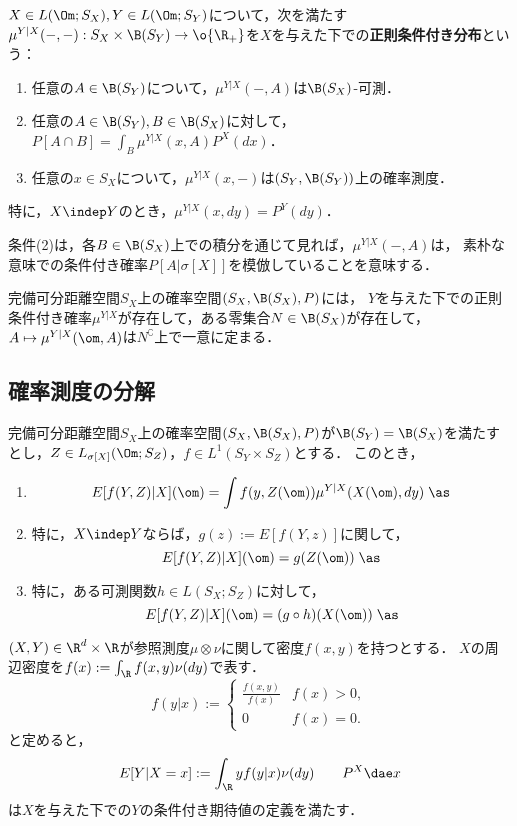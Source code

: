 \documentclass[uplatex,dvipdfmx]{jsreport}
\begin{document}
\begin{definition}
    $X\in L(\Om;S_X),Y\in L(\Om;S_Y)$について，次を満たす$\mu^{Y|X}(-,-):S_X\times\B(S_Y)\to\o{\R_+}$を$X$を与えた下での\textbf{正則条件付き分布}という：
    \begin{enumerate}
        \item 任意の$A\in\B(S_Y)$について，$\mu^{Y|X}(-,A)$は$\B(S_X)$-可測．
        \item 任意の$A\in\B(S_Y),B\in\B(S_X)$に対して，$P[A\cap B]=\int_B\mu^{Y|X}(x,A)P^X(dx)$．
        \item 任意の$x\in S_X$について，$\mu^{Y|X}(x,-)$は$(S_Y,\B(S_Y))$上の確率測度．
    \end{enumerate}
    特に，$X\indep Y$のとき，$\mu^{Y|X}(x,dy)=P^Y(dy)$．
\end{definition}
\begin{remarks}
    条件(2)は，各$B\in\B(S_X)$上での積分を通じて見れば，$\mu^{Y|X}(-,A)$は，
    素朴な意味での条件付き確率$P[A|\sigma[X]]$を模倣していることを意味する．
\end{remarks}

\begin{theorem}
    完備可分距離空間$S_X$上の確率空間$(S_X,\B(S_X),P)$には，
    $Y$を与えた下での正則条件付き確率$\mu^{Y|X}$が存在して，ある零集合$N\in\B(S_X)$が存在して，$A\mapsto\mu^{Y|X}(\om,A)$は$N^\complement$上で一意に定まる．
\end{theorem}

\subsection{確率測度の分解}

\begin{theorem}
    完備可分距離空間$S_X$上の確率空間$(S_X,\B(S_X),P)$が$\B(S_Y)=\B(S_X)$を満たすとし，$Z\in L_{\sigma[X]}(\Om;S_Z)$，$f\in L^1(S_Y\times S_Z)$とする．
    このとき，
    \begin{enumerate}
        \item \[E[f(Y,Z)|X](\om)=\int f(y,Z(\om))\mu^{Y|X}(X(\om),dy)\;\as\]
        \item 特に，$X\indep Y$ならば，$g(z):=E[f(Y,z)]$に関して，
        \[E[f(Y,Z)|X](\om)=g(Z(\om))\;\as\]
        \item 特に，ある可測関数$h\in L(S_X;S_Z)$に対して，
        \[E[f(Y,Z)|X](\om)=(g\circ h)(X(\om))\;\as\]
    \end{enumerate}
\end{theorem}

\begin{example}[条件付き密度関数]
    $(X,Y)\in\R^d\times\R$が参照測度$\mu\otimes\nu$に関して密度$f(x,y)$を持つとする．
    $X$の周辺密度を$f(x):=\int_\R f(x,y)\nu(dy)$で表す．
    \[f(y|x):=\begin{cases}
        \frac{f(x,y)}{f(x)}&f(x)>0,\\
        0&f(x)=0.
    \end{cases}\]
    と定めると，
    \[E[Y|X=x]:=\int_\R yf(y|x)\nu(dy)\qquad P^X\dae x\]
    は$X$を与えた下での$Y$の条件付き期待値の定義を満たす．
\end{example}
\end{document}
